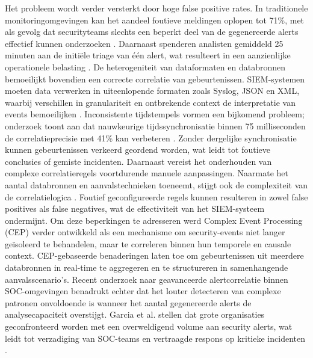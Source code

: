 \newline
\newline
Het probleem wordt verder versterkt door hoge false positive rates. In traditionele monitoringomgevingen kan het aandeel foutieve meldingen oplopen tot 71\%, met als gevolg dat securityteams slechts een beperkt deel van de gegenereerde alerts effectief kunnen onderzoeken \autocite{Sivakumaran2025}. Daarnaast spenderen analisten gemiddeld 25 minuten aan de initiële triage van één alert, wat resulteert in een aanzienlijke operationele belasting \autocite{Sivakumaran2025}.
\newline
\newline
De heterogeniteit van dataformaten en databronnen bemoeilijkt bovendien een correcte correlatie van gebeurtenissen. SIEM-systemen moeten data verwerken in uiteenlopende formaten zoals Syslog, JSON en XML, waarbij verschillen in granulariteit en ontbrekende context de interpretatie van events bemoeilijken \autocite{Omoseebi2022}. Inconsistente tijdstempels vormen een bijkomend probleem; onderzoek toont aan dat nauwkeurige tijdssynchronisatie binnen 75 milliseconden de correlatieprecisie met 41\% kan verbeteren \autocite{Sivakumaran2025}. Zonder dergelijke synchronisatie kunnen gebeurtenissen verkeerd geordend worden, wat leidt tot foutieve conclusies of gemiste incidenten.
\newline
\newline
Daarnaast vereist het onderhouden van complexe correlatieregels voortdurende manuele aanpassingen. Naarmate het aantal databronnen en aanvalstechnieken toeneemt, stijgt ook de complexiteit van de correlatielogica \autocite{Omoseebi2022}. Foutief geconfigureerde regels kunnen resulteren in zowel false positives als false negatives, wat de effectiviteit van het SIEM-systeem ondermijnt.
\newline
\newline
Om deze beperkingen te adresseren werd Complex Event Processing (CEP) verder ontwikkeld als een mechanisme om security-events niet langer geïsoleerd te behandelen, maar te correleren binnen hun temporele en causale context. CEP-gebaseerde benaderingen laten toe om gebeurtenissen uit meerdere databronnen in real-time te aggregeren en te structureren in samenhangende aanvalsscenario’s.
\newline
\newline
Recent onderzoek naar geavanceerde alertcorrelatie binnen SOC-omgevingen benadrukt echter dat het louter detecteren van complexe patronen onvoldoende is wanneer het aantal gegenereerde alerts de analysecapaciteit overstijgt. Garcia et al. stellen dat grote organisaties geconfronteerd worden met een overweldigend volume aan security alerts, wat leidt tot verzadiging van SOC-teams en vertraagde respons op kritieke incidenten \autocite{Garcia2025ROSCA}.
